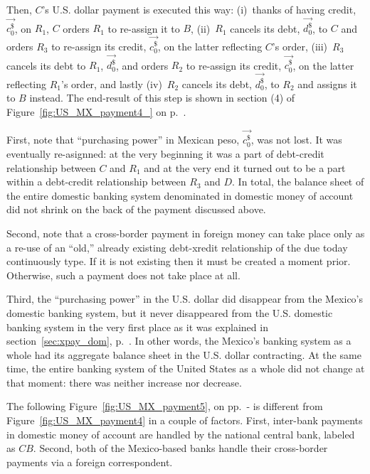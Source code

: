 Then, $C$'s U.S. dollar payment is executed this way: (i)~thanks of having credit, $\overrightarrow{c^{\$}_{0}}$, on $R_1$, $C$ orders $R_1$ to re-assign it to $B$, (ii)~$R_1$ cancels its debt, $\overrightarrow{d^{\$}_{0}}$, to $C$ and orders $R_3$ to re-assign its credit, $\overrightarrow{c^{\$}_{0}}$, on the latter reflecting $C$'s order, (iii)~$R_3$ cancels its debt to $R_1$, $\overrightarrow{d^{\$}_{0}}$, and orders $R_2$ to re-assign its credit, $\overrightarrow{c^{\$}_{0}}$, on the latter reflecting $R_1$'s order, and lastly (iv)~$R_2$ cancels its debt, $\overrightarrow{d^{\$}_{0}}$, to $R_2$ and assigns it to $B$ instead. The end-result of this step is shown in section (4) of Figure~\ref{fig:US_MX_payment4_} on p.~\pageref{fig:US_MX_payment4_}.

First,\label{tag1} note that ``purchasing power'' in Mexican peso, $\overrightarrow{c^{\$}_{0}}$, was not lost. It was eventually re-asignned: at the very beginning it was a part of debt-credit relationship between $C$ and $R_1$ and at the very end it turned out to be a part within a debt-credit relationship between $R_3$ and $D$. In total, the balance sheet of the entire domestic banking system denominated in domestic money of account did not shrink on the back of the payment discussed above.

Second, note that a cross-border payment in foreign money can take place only as a re-use of an ``old,'' already existing debt-xredit relationship of the due today continuously type. If it is not existing then it must be created a moment prior. Otherwise, such a payment does not take place at all.   

Third, the ``purchasing power'' in the U.S. dollar did disappear from the Mexico's domestic banking system, but it never disappeared from the U.S. domestic banking system in the very first place as it was explained in section~\ref{sec:xpay_dom}, p.~\pageref{sec:xpay_dom}. In other words, the Mexico's banking system as a whole had its aggregate balance sheet in the U.S. dollar contracting. At the same time, the entire banking system of the United States as a whole did not change at that moment: there was neither increase nor decrease. 

The following Figure~\ref{fig:US_MX_payment5}, on pp.~\pageref{fig:US_MX_payment5}-\pageref{fig:US_MX_payment5_} is different from Figure~\ref{fig:US_MX_payment4} in a couple of factors. First, inter-bank payments in domestic money of account are handled by the national central bank, labeled as $CB$. Second, both of the Mexico-based banks handle their cross-border payments via a foreign correspondent. 


